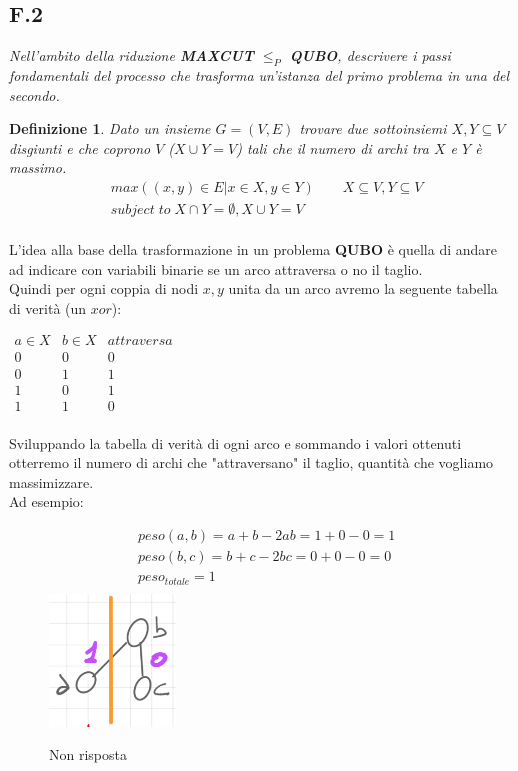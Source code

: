 \documentclass[a4paper]{article}
\newtheorem*{definition}{Definizione}
\begin{document}
\subsection{F.2}
\label{SEC:F2}
\emph{Nell’ambito della riduzione \textbf{MAXCUT} $\leq_P$ \textbf{QUBO}, descrivere i passi fondamentali del processo che trasforma un’istanza del primo problema in una del secondo.}
\begin{definition}
	Dato un insieme $G=(V,E)$ trovare due sottoinsiemi $X,Y \subseteq V$ disgiunti e che coprono $V$ ($X \cup Y = V$) tali che il numero di archi tra $X$ e $Y$ è massimo.
	\begin{align*}
		& max((x,y) \in E \vert x \in X, y \in Y) \qquad X \subseteq V, Y \subseteq V \\
		& subject \; to \; X \cap Y = \emptyset , X \cup Y = V\\
	\end{align*}
\end{definition}
L'idea alla base della trasformazione in un problema \textbf{QUBO} è quella di andare ad indicare con variabili binarie se un arco attraversa o no il taglio.\\
Quindi per ogni coppia di nodi $x,y$ unita da un arco avremo la seguente tabella di verità (un $xor$):
\begin{center}$\begin{array}{c|c|c}
 a \in X & b \in X & attraversa \\
\hline
 0 & 0 & 0  \\ 
 0 & 1 & 1  \\
 1 & 0 & 1  \\
 1 & 1 & 0  \\ %
\end{array}$
\end{center}
Sviluppando la tabella di verità di ogni arco e sommando i valori ottenuti otterremo il numero di archi che "attraversano" il taglio, quantità che vogliamo massimizzare.\\
Ad esempio:\\
\begin{figure}[!ht]
                \centering
		\begin{align*}
			& peso(a,b) = a + b -2ab = 1 + 0 - 0 = 1 \\
			& peso(b,c) = b + c -2bc = 0 + 0 - 0 = 0 \\
			& peso_{totale} = 1\\
		\end{align*}
                \includegraphics[width = 0.3\textwidth]{./img/F2_NR.png}
                \caption{Non risposta} \label{FIG:F2_false}
\end{figure}
\end{document}
